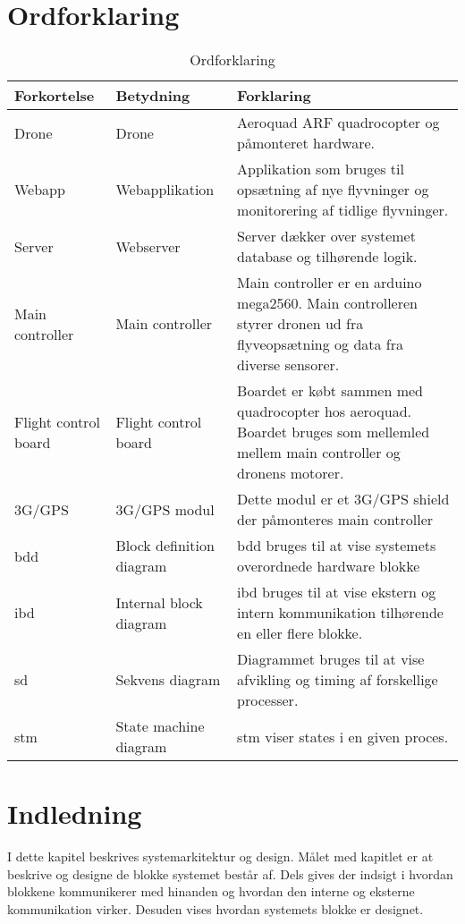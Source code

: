 \section{Ordforklaring}
\begin{table}[H]
	\centering
		\begin{tabular}{|p{2.6cm}|p{4.5 cm}|p{6.5 cm}|} 
		\hline
			\textbf{Forkortelse} & \textbf{Betydning} & \textbf{Forklaring} \\ \hline
			 Drone & Drone & Aeroquad ARF quadrocopter og \newline påmonteret hardware. \\ \hline
			 Webapp & Webapplikation & Applikation som bruges til opsætning af nye flyvninger og monitorering af tidlige flyvninger. \\ \hline
			 Server & Webserver & Server dækker over systemet database og tilhørende logik. \\ \hline
			 Main controller & Main controller  & Main controller er en arduino mega2560. Main controlleren styrer dronen ud fra flyveopsætning og data fra diverse sensorer.   \\ \hline
			 Flight control \newline board & Flight control board  & Boardet er købt sammen med quadrocopter hos aeroquad. Boardet bruges som mellemled mellem main controller og dronens motorer.  \\ \hline
			 3G/GPS & 3G/GPS modul  & Dette modul er et 3G/GPS shield der påmonteres main controller  \\ \hline			 
			 
			 bdd& Block definition diagram  & bdd bruges til at vise systemets overordnede hardware blokke  \\ \hline
			 ibd& Internal block diagram & ibd bruges til at vise ekstern og intern kommunikation tilhørende en eller flere blokke. \\ \hline
			 sd& Sekvens diagram & Diagrammet bruges til at vise afvikling og timing af forskellige processer. \\ \hline
			 stm& State machine diagram & stm viser states i en given proces. \\ \hline
		\end{tabular}
	\caption{Ordforklaring}
\end{table}

\vspace{1cm}

\section{Indledning}
I dette kapitel beskrives systemarkitektur og design. Målet med kapitlet er at beskrive og designe de blokke systemet består af. Dels gives der indsigt i hvordan blokkene kommunikerer med hinanden og hvordan den interne og eksterne kommunikation virker. Desuden vises hvordan systemets blokke er designet. 